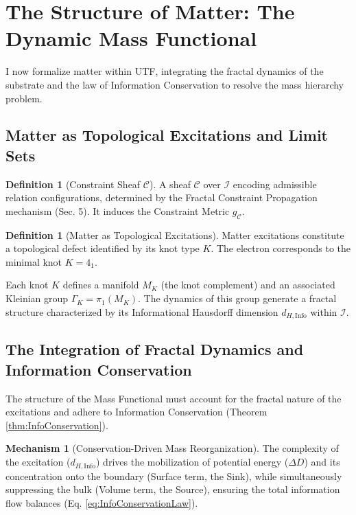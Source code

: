 \documentclass[11pt, a4paper]{article}
\theoremstyle{definition}
\newtheorem{definition}[theorem]{Definition}
\newtheorem{mechanism}{Mechanism}
\theoremstyle{definition}
\newcommand{\Ical}{\mathcal{I}}
\newcommand{\Csheaf}{\mathscr{C}}
\newcommand{\dHInfo}{d_{H,\mathrm{Info}}} %
\newcommand{\KleinianGroup}{\Gamma} %
\begin{document}
\section{The Structure of Matter: The Dynamic Mass Functional}

I now formalize matter within UTF, integrating the fractal dynamics of the substrate and the law of Information Conservation to resolve the mass hierarchy problem.

\subsection{Matter as Topological Excitations and Limit Sets}

\begin{definition}[Constraint Sheaf $\Csheaf$]
A sheaf $\Csheaf$ over $\Ical$ encoding admissible relation configurations, determined by the Fractal Constraint Propagation mechanism (Sec. 5). It induces the Constraint Metric $g_{\Csheaf}$.
\end{definition}

\begin{definition}[Matter as Topological Excitations]
Matter excitations constitute a topological defect identified by its knot type $K$. The electron corresponds to the minimal knot $K=4_1$.
\end{definition}

Each knot $K$ defines a manifold $M_K$ (the knot complement) and an associated Kleinian group $\KleinianGroup_K = \pi_1(M_K)$. The dynamics of this group generate a fractal structure characterized by its Informational Hausdorff dimension $\dHInfo$ within $\Ical$.

\subsection{The Integration of Fractal Dynamics and Information Conservation}

The structure of the Mass Functional must account for the fractal nature of the excitations and adhere to Information Conservation (Theorem \ref{thm:InfoConservation}).

\begin{mechanism}[Conservation-Driven Mass Reorganization]
The complexity of the excitation ($\dHInfo$) drives the mobilization of potential energy ($\Delta D$) and its concentration onto the boundary (Surface term, the Sink), while simultaneously suppressing the bulk (Volume term, the Source), ensuring the total information flow balances (Eq. \eqref{eq:InfoConservationLaw}).
\end{mechanism}
\end{document}
